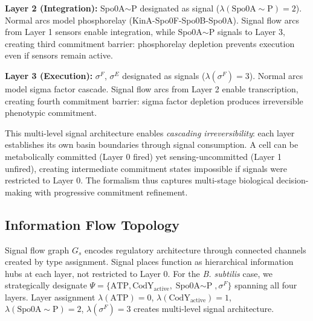 \documentclass[10pt,letterpaper]{article}
\begin{document}
\vspace{3pt}
\noindent\textbf{Layer 2 (Integration):} Spo0A$\sim$P designated as signal ($\lambda(\text{Spo0A}\sim\text{P}) = 2$). Normal arcs model phosphorelay (KinA-Spo0F-Spo0B-Spo0A). Signal flow arcs from Layer 1 sensors enable integration, while Spo0A$\sim$P signals to Layer 3, creating third commitment barrier: phosphorelay depletion prevents execution even if sensors remain active.

\vspace{3pt}
\noindent\textbf{Layer 3 (Execution):} $\sigma^F$, $\sigma^E$ designated as signals ($\lambda(\sigma^F) = 3$). Normal arcs model sigma factor cascade. Signal flow arcs from Layer 2 enable transcription, creating fourth commitment barrier: sigma factor depletion produces irreversible phenotypic commitment.

\vspace{3pt}
\noindent This multi-level signal architecture enables \textit{cascading irreversibility}: each layer establishes its own basin boundaries through signal consumption. A cell can be metabolically committed (Layer 0 fired) yet sensing-uncommitted (Layer 1 unfired), creating intermediate commitment states impossible if signals were restricted to Layer 0. The formalism thus captures multi-stage biological decision-making with progressive commitment refinement.

\subsection{Information Flow Topology}

Signal flow graph $G_s$ encodes regulatory architecture through connected channels created by type assignment. Signal places function as hierarchical information hubs at each layer, not restricted to Layer 0. For the \textit{B. subtilis} case, we strategically designate $\Psi = \{\text{ATP}, \text{CodY}_{\text{active}}, \text{Spo0A$\sim$P}, \sigma^F\}$ spanning all four layers. Layer assignment $\lambda(\text{ATP}) = 0$, $\lambda(\text{CodY}_{\text{active}}) = 1$, $\lambda(\text{Spo0A$\sim$P}) = 2$, $\lambda(\sigma^F) = 3$ creates multi-level signal architecture.
\end{document}
